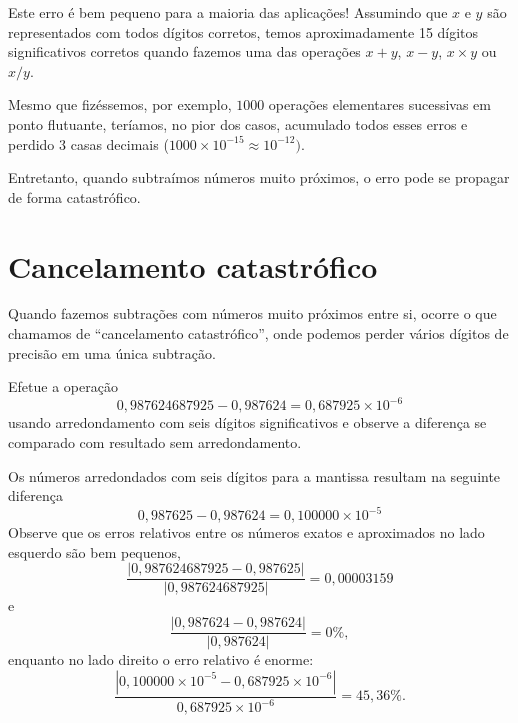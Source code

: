 Este erro é bem pequeno para a maioria das aplicações! Assumindo que $x$ e $y$ são representados com todos dígitos corretos, temos aproximadamente 15 dígitos significativos corretos quando fazemos uma das operações $x+y$, $x-y$, $x\times y$ ou $x/y$.


Mesmo que fizéssemos, por exemplo, $1000$ operações elementares sucessivas em ponto flutuante, teríamos, no pior dos casos, acumulado todos esses erros e perdido $3$ casas decimais ($1000\times 10^{-15} \approx 10^{-12})$.

Entretanto, quando subtraímos números muito próximos, o erro pode se propagar de forma catastrófico.

\section{Cancelamento catastrófico}

Quando fazemos subtrações com números muito próximos entre si, ocorre o que chamamos de ``cancelamento catastrófico'', onde podemos perder vários dígitos de precisão em uma única subtração.

\begin{ex}Efetue a operação
  \begin{equation*}
    0,987624687925-0,987624=0,687925\times 10^{-6}
  \end{equation*}
usando arredondamento com seis dígitos significativos e observe a diferença se comparado com resultado sem arredondamento.
\end{ex}
\begin{sol}
Os números arredondados com seis dígitos para a mantissa resultam na seguinte diferença
$$
0,987625-0,987624=0,100000\times 10^{-5}
$$
Observe que os erros relativos entre os números exatos e aproximados no lado esquerdo são bem pequenos,
\begin{equation*}
  \frac{|0,987624687925-0,987625|}{|0,987624687925|}=0,00003159
\end{equation*}
e
\begin{equation*}
  \frac{|0,987624-0,987624|}{|0,987624|}=0\%,
\end{equation*}
enquanto no lado direito o erro relativo é enorme:
\begin{equation*}
\frac{|0,100000\times 10^{-5}-0,687925\times 10^{-6}|}{0,687925\times 10^{-6}}=45,36\%.
\end{equation*}
\end{sol}


